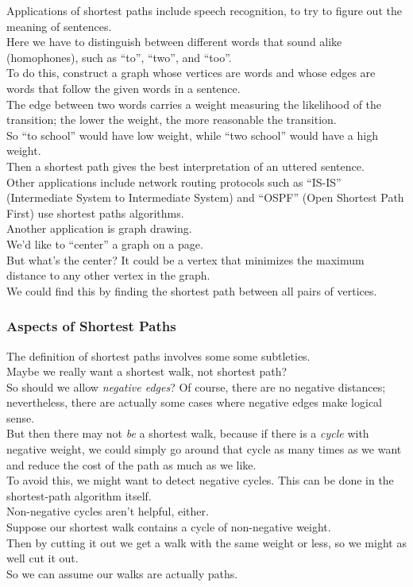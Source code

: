 \documentclass[12pt]{article}
\theoremstyle{plain}
\theoremstyle{definition}
\begin{document}
Applications of shortest paths include speech recognition, to try to figure out the meaning of sentences. \\
Here we have to distinguish between different words that sound alike (homophones), such as ``to'', ``two'', and ``too''. \\
To do this, construct a graph whose vertices are words and whose edges are words that follow the given words in a sentence. \\
The edge between two words carries a weight measuring the likelihood of the transition;
the lower the weight, the more reasonable the transition. \\
So ``to school'' would have low weight, while ``two school'' would have a high weight. \\
Then a shortest path gives the best interpretation of an uttered sentence. \\

Other applications include network routing protocols such as ``IS-IS'' (Intermediate System to Intermediate System) and ``OSPF'' (Open Shortest Path First) use shortest paths algorithms. \\

Another application is graph drawing. \\
We'd like to ``center'' a graph on a page. \\
But what's the center?
It could be a vertex that minimizes the maximum distance to any other vertex in the graph. \\
We could find this by finding the shortest path between all pairs of vertices.

\subsubsection{Aspects of Shortest Paths}
The definition of shortest paths involves some some subtleties. \\
Maybe we really want a shortest walk, not shortest path? \\
So should we allow \emph{negative edges}?
Of course, there are no negative distances;
nevertheless, there are actually some cases where negative edges make logical sense. \\
But then there may not \emph{be} a shortest walk, because if there is a \emph{cycle} with negative weight, we could simply go around that cycle as many times as we want and reduce the cost of the path as much as we like. \\
To avoid this, we might want to detect negative cycles.
This can be done in the shortest-path algorithm itself. \\
Non-negative cycles aren't helpful, either. \\
Suppose our shortest walk contains a cycle of non-negative weight. \\
Then by cutting it out we get a walk with the same weight or less, so we might as well cut it out. \\
So we can assume our walks are actually paths.
\end{document}
